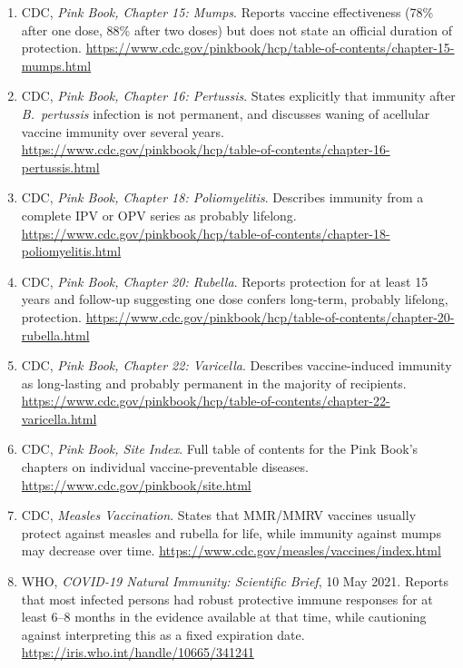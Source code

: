 \documentclass[11pt]{article}
\begin{document}
\begin{enumerate}
\item \label{ref:pinkbook-ch15} CDC, \emph{Pink Book, Chapter 15: Mumps}.
Reports vaccine effectiveness (78\% after one dose, 88\% after two doses)
but does not state an official duration of protection.
\url{https://www.cdc.gov/pinkbook/hcp/table-of-contents/chapter-15-mumps.html}

\item \label{ref:pinkbook-ch16} CDC, \emph{Pink Book, Chapter 16:
Pertussis}. States explicitly that immunity after \emph{B.\ pertussis}
infection is not permanent, and discusses waning of acellular vaccine
immunity over several years.
\url{https://www.cdc.gov/pinkbook/hcp/table-of-contents/chapter-16-pertussis.html}

\item \label{ref:pinkbook-ch18} CDC, \emph{Pink Book, Chapter 18:
Poliomyelitis}. Describes immunity from a complete IPV or OPV series as
probably lifelong.
\url{https://www.cdc.gov/pinkbook/hcp/table-of-contents/chapter-18-poliomyelitis.html}

\item \label{ref:pinkbook-ch20} CDC, \emph{Pink Book, Chapter 20:
Rubella}. Reports protection for at least 15 years and follow-up
suggesting one dose confers long-term, probably lifelong, protection.
\url{https://www.cdc.gov/pinkbook/hcp/table-of-contents/chapter-20-rubella.html}

\item \label{ref:pinkbook-ch22} CDC, \emph{Pink Book, Chapter 22:
Varicella}. Describes vaccine-induced immunity as long-lasting and
probably permanent in the majority of recipients.
\url{https://www.cdc.gov/pinkbook/hcp/table-of-contents/chapter-22-varicella.html}

\item \label{ref:pinkbook-index} CDC, \emph{Pink Book, Site Index}. Full
table of contents for the Pink Book's chapters on individual
vaccine-preventable diseases.
\url{https://www.cdc.gov/pinkbook/site.html}

\item \label{ref:cdc-measles-vax} CDC, \emph{Measles Vaccination}.
States that MMR/MMRV vaccines usually protect against measles and rubella
for life, while immunity against mumps may decrease over time.
\url{https://www.cdc.gov/measles/vaccines/index.html}

\item \label{ref:who-brief} WHO, \emph{COVID-19 Natural Immunity:
Scientific Brief}, 10 May 2021. Reports that most infected persons had
robust protective immune responses for at least 6--8 months in the
evidence available at that time, while cautioning against interpreting
this as a fixed expiration date.
\url{https://iris.who.int/handle/10665/341241}


\end{enumerate}
\end{document}

